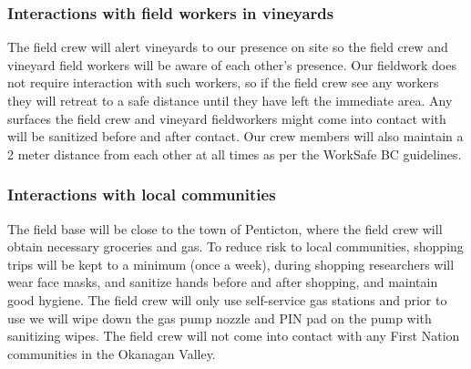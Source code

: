 \documentclass[11pt,letter]{article}
\begin{document}
\subsubsection{Interactions with field workers in vineyards}
The field crew will alert vineyards to our presence on site so the field crew and vineyard field workers will be aware of each other's presence. Our fieldwork does not require interaction with such workers, so if the field crew see any workers they will retreat to a safe distance until they have left the immediate area. Any surfaces the field crew and vineyard fieldworkers might come into contact with will be sanitized before and after contact. Our crew members will also maintain a 2 meter distance from each other at all times as per the WorkSafe BC guidelines.   

\subsubsection{Interactions with local communities}
The field base will be close to the town of Penticton, where the field crew will obtain necessary groceries and gas. To reduce risk to local communities, shopping trips will be kept to a minimum (once a week), during shopping researchers will wear face masks, and sanitize hands before and after shopping, and maintain good hygiene. The field crew will only use self-service gas stations and prior to use we will wipe down the gas pump nozzle and PIN pad on the pump with sanitizing wipes. The field crew will not come into contact with any First Nation communities in the Okanagan Valley. 
\end{document}
